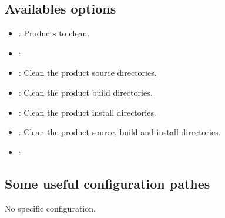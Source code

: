 \documentclass[a4paper,10pt,english]{sphinxmanual}
\begin{document}
\subsection{Availables options}
\label{\detokenize{commands/clean:availables-options}}\begin{itemize}
\item {} 
 : Products to clean.

\item {} 
 :


\item {} 
 : Clean the product source directories.

\item {} 
 : Clean the product build directories.

\item {} 
 : Clean the product install directories.

\item {} 
 : Clean the product source, build and install directories.

\item {} 
 :


\end{itemize}


\subsection{Some useful configuration pathes}
\label{\detokenize{commands/clean:some-useful-configuration-pathes}}
No specific configuration.
\end{document}
